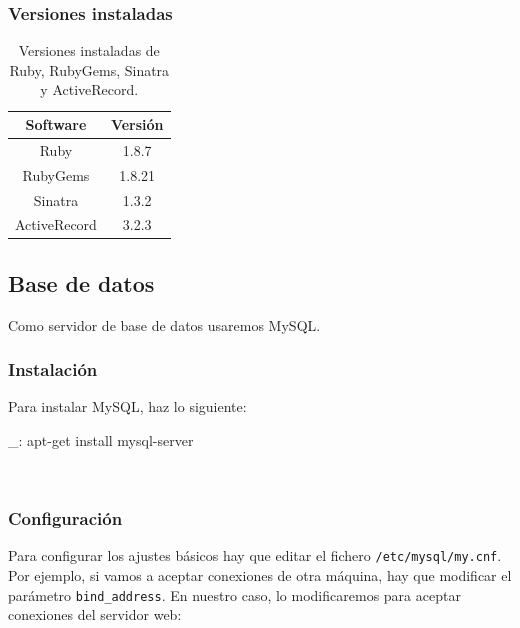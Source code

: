 \subsubsection{Versiones instaladas}

\begin{table}[!htbp]
\centering
   \begin{tabular}{|c|c|}
      \hline
      \textbf{Software} & \textbf{Versión} \\ \hline
      Ruby & 1.8.7 \\ \hline
      RubyGems & 1.8.21 \\ \hline
      Sinatra & 1.3.2 \\ \hline
      ActiveRecord & 3.2.3 \\ \hline
   \end{tabular}
\caption{Versiones instaladas de Ruby, RubyGems, Sinatra y ActiveRecord.}
\label{table:web-mysql-versions}
\end{table}




\subsection{Base de datos}


Como servidor de base de datos usaremos MySQL.


\subsubsection{Instalación}

Para instalar MySQL, haz lo siguiente:

\begin{bashcode}
_: apt-get install mysql-server
\end{bashcode}
\\


\subsubsection{Configuración}

Para configurar los ajustes básicos hay que editar el fichero \texttt{/etc/mysql/my.cnf}. Por ejemplo, si vamos a aceptar conexiones de otra máquina, hay que modificar el parámetro \texttt{bind\_address}. En nuestro caso, lo modificaremos para aceptar conexiones del servidor web:

